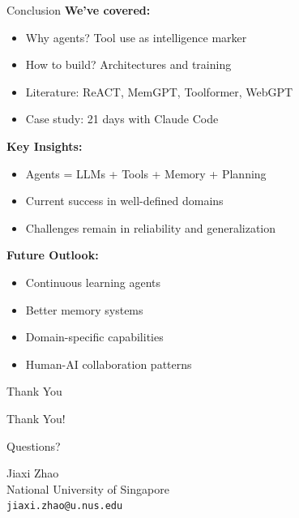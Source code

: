 \documentclass[aspectratio=169]{beamer}
\begin{document}
\begin{frame}{Conclusion}
	\textbf{We've covered:}
	\begin{itemize}
		\item {\color{highlight}Why agents?} Tool use as intelligence marker
		\item {\color{highlight}How to build?} Architectures and training
		\item {\color{highlight}Literature:} ReACT, MemGPT, Toolformer, WebGPT
		\item {\color{highlight}Case study:} 21 days with Claude Code
	\end{itemize}
	
	\textbf{Key Insights:}
	\begin{itemize}
		\item Agents = LLMs + Tools + Memory + Planning
		\item Current success in well-defined domains
		\item Challenges remain in reliability and generalization
	\end{itemize}
	
	\textbf{Future Outlook:}
	\begin{itemize}
		\item Continuous learning agents
		\item Better memory systems
		\item Domain-specific capabilities
		\item Human-AI collaboration patterns
	\end{itemize}
\end{frame}

\begin{frame}{Thank You}
	\begin{center}
		\Huge Thank You!
		
		\vspace{1cm}
		
		\Large Questions?
		
		\vspace{1cm}
		
		\normalsize
		Jiaxi Zhao\\
		National University of Singapore\\
		\texttt{jiaxi.zhao@u.nus.edu}
	\end{center}
\end{frame}
\end{document}
